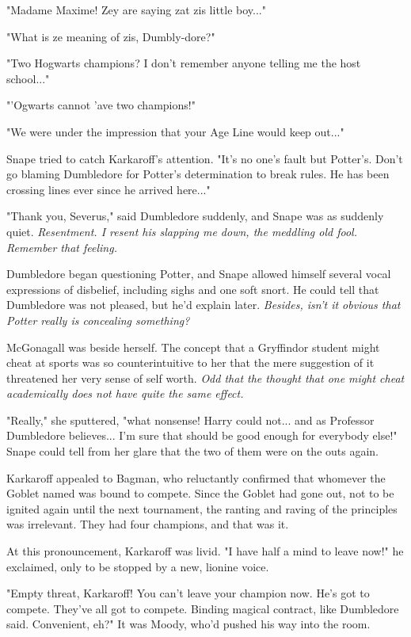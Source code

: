 "Madame Maxime! Zey are saying zat zis little boy..."

"What is ze meaning of zis, Dumbly-dore?"

"Two Hogwarts champions? I don't remember anyone telling me the host school..."

"'Ogwarts cannot 'ave two champions!"

"We were under the impression that your Age Line would keep out..."

Snape tried to catch Karkaroff's attention. "It's no one's fault but Potter's. Don't go blaming Dumbledore for Potter's determination to break rules. He has been crossing lines ever since he arrived here..."

"Thank you, Severus," said Dumbledore suddenly, and Snape was as suddenly quiet. \emph{Resentment. I resent his slapping me down, the meddling old fool. Remember that feeling.}

Dumbledore began questioning Potter, and Snape allowed himself several vocal expressions of disbelief, including sighs and one soft snort. He could tell that Dumbledore was not pleased, but he'd explain later. \emph{Besides, isn't it obvious that Potter really is concealing something?}

McGonagall was beside herself. The concept that a Gryffindor student might cheat at sports was so counterintuitive to her that the mere suggestion of it threatened her very sense of self worth. \emph{Odd that the thought that one might cheat academically does not have quite the same effect.}

"Really," she sputtered, "what nonsense! Harry could not... and as Professor Dumbledore believes... I'm sure that should be good enough for everybody else!" Snape could tell from her glare that the two of them were on the outs again.

Karkaroff appealed to Bagman, who reluctantly confirmed that whomever the Goblet named was bound to compete. Since the Goblet had gone out, not to be ignited again until the next tournament, the ranting and raving of the principles was irrelevant. They had four champions, and that was it.

At this pronouncement, Karkaroff was livid. "I have half a mind to leave now!" he exclaimed, only to be stopped by a new, lionine voice.

"Empty threat, Karkaroff! You can't leave your champion now. He's got to compete. They've all got to compete. Binding magical contract, like Dumbledore said. Convenient, eh?" It was Moody, who'd pushed his way into the room.

